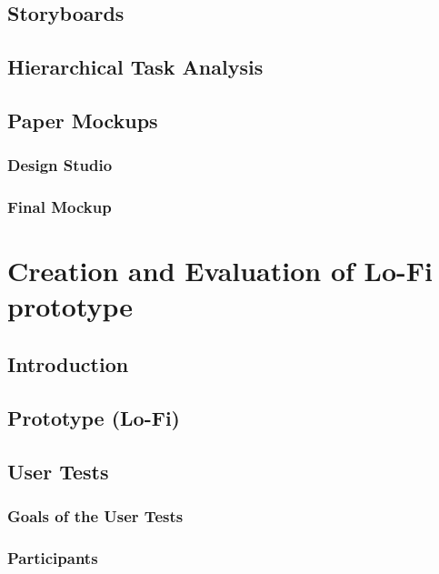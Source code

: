 \documentclass[11pt]{report}
\begin{document}
\section{Storyboards}

\section{Hierarchical Task Analysis}

\section{Paper Mockups}

\subsection{Design Studio}

\subsection{Final Mockup}

\chapterfont{\LARGE \centering}
\chaptertitlefont{\Large \centering}
\chapter{Creation and Evaluation of  Lo-Fi prototype}

\section{Introduction}

\section{Prototype (Lo-Fi)}

\section{User Tests}

\subsection{Goals of the User Tests}

\subsection{Participants}
\end{document}
